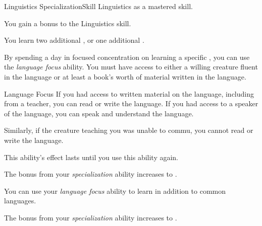     \begin{feat}{Linguistics Specialization}{Skill}
        \featpre Linguistics as a mastered skill.

         You gain a  bonus to the Linguistics skill.

         You learn two additional , or one additional .

         By spending a day in focused concentration on learning a specific , you can use the \textit{language focus} ability.
        You must have access to either a willing creature fluent in the language or at least a book's worth of material written in the language.
        \begin{freeability}{Language Focus}
            If you had access to written material on the language, including from a teacher, you can read or write the language.
            If you had access to a speaker of the language, you can speak and understand the language.

            Similarly, if the creature teaching you was unable to commu, you cannot read or write the language.

            This ability's effect lasts until you use this ability again.
        \end{freeability}

         The bonus from your \textit{specialization} ability increases to .

         You can use your \textit{language focus} ability to learn  in addition to common languages.

         The bonus from your \textit{specialization} ability increases to .
    \end{feat}

